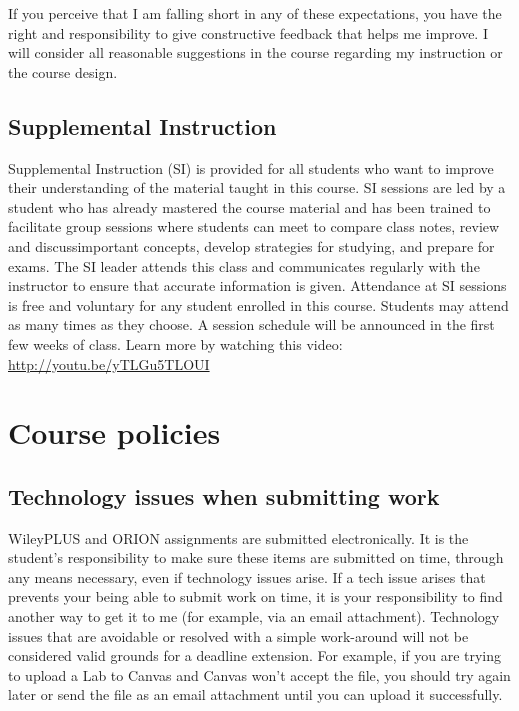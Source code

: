 If you perceive that I am falling short in any of these expectations,
you have the right and responsibility to give constructive feedback that
helps me improve. I will consider all reasonable suggestions in the
course regarding my instruction or the course design.

\hypertarget{supplemental-instruction}{%
\subsection{Supplemental Instruction}\label{supplemental-instruction}}

Supplemental Instruction (SI) is provided for all students who want to
improve their understanding of the material taught in this course. SI
sessions are led by a student who has already mastered the course
material and has been trained to facilitate group sessions where
students can meet to compare class notes, review and discussimportant
concepts, develop strategies for studying, and prepare for exams. The SI
leader attends this class and communicates regularly with the instructor
to ensure that accurate information is given. Attendance at SI sessions
is free and voluntary for any student enrolled in this course. Students
may attend as many times as they choose. A session schedule will be
announced in the first few weeks of class. Learn more by watching this
video: \url{http://youtu.be/yTLGu5TLOUI}

\hypertarget{course-policies}{%
\section{Course policies}\label{course-policies}}

\hypertarget{technology-issues-when-submitting-work}{%
\subsection{Technology issues when submitting
work}\label{technology-issues-when-submitting-work}}

WileyPLUS and ORION assignments are submitted electronically. It is the
student's responsibility to make sure these items are submitted on time,
through any means necessary, even if technology issues arise. If a tech
issue arises that prevents your being able to submit work on time, it is
your responsibility to find another way to get it to me (for example,
via an email attachment). Technology issues that are avoidable or
resolved with a simple work-around will not be considered valid grounds
for a deadline extension. For example, if you are trying to upload a Lab
to Canvas and Canvas won't accept the file, you should try again later
or send the file as an email attachment until you can upload it
successfully.

